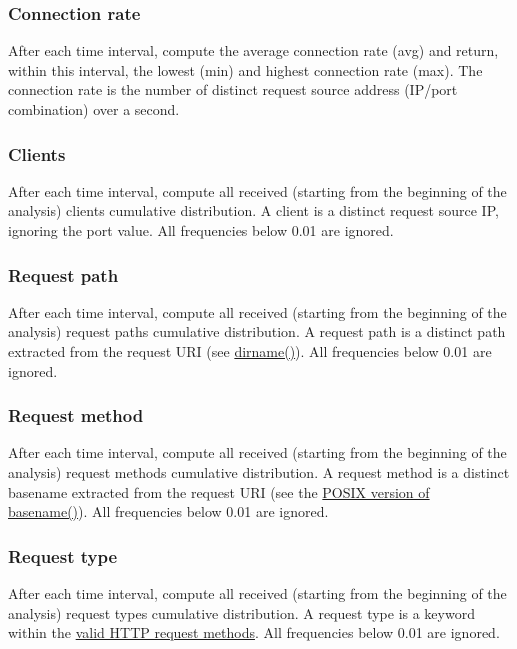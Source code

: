 \documentclass[12pt,hidelinks]{article}
\begin{document}
\subsubsection{Connection rate}
After each time interval, compute the average connection rate (avg) and return, within this interval, the lowest (min) and highest connection rate (max).
The connection rate is the number of distinct request source address (IP/port combination) over a second. 


\subsubsection{Clients}

After each time interval, compute all received (starting from the beginning of the analysis) clients cumulative distribution. 
A client is a distinct request source IP, ignoring the port value. All frequencies below 0.01 are ignored.

\subsubsection{Request path}

After each time interval, compute all received (starting from the beginning of the analysis) request paths cumulative distribution. 
A request path is a distinct path extracted from the request URI (see \href{https://linux.die.net/man/3/dirname}{dirname()}). All frequencies below 0.01 are ignored.

\subsubsection{Request method}

After each time interval, compute all received (starting from the beginning of the analysis) request methods cumulative distribution. 
A request method is a distinct basename extracted from the request URI (see the \href{http://man7.org/linux/man-pages/man3/basename.3.html}{POSIX version of basename()}). All frequencies below 0.01 are ignored.

\subsubsection{Request type}

After each time interval, compute all received (starting from the beginning of the analysis) request types cumulative distribution. 
A request type is a keyword within the \href{https://developer.mozilla.org/en-US/docs/Web/HTTP/Methods}{valid HTTP request methods}. All frequencies below 0.01 are ignored.
\end{document}
